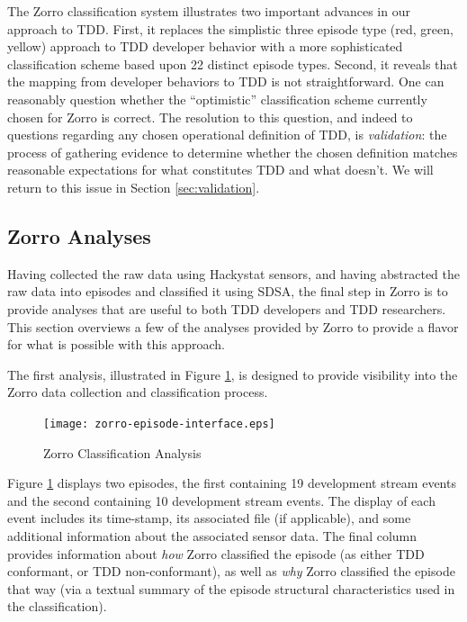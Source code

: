 \documentclass[smallextended]{svjour3}     %
\begin{document}
The Zorro classification system illustrates two important advances in our
approach to TDD.  First, it replaces the simplistic three episode type
(red, green, yellow) approach to TDD developer behavior with a more
sophisticated classification scheme based upon 22 distinct episode
types. Second, it reveals that the mapping from developer behaviors to TDD
is not straightforward. One can reasonably question whether the
``optimistic'' classification scheme currently chosen for Zorro is correct.
The resolution to this question, and indeed to questions regarding any
chosen operational definition of TDD, is {\em validation}: the process of
gathering evidence to determine whether the chosen definition matches
reasonable expectations for what constitutes TDD and what doesn't. We will
return to this issue in Section \ref{sec:validation}.


\subsection{Zorro Analyses}

Having collected the raw data using Hackystat sensors, and having
abstracted the raw data into episodes and classified it using SDSA, the
final step in Zorro is to provide analyses that are useful to both TDD
developers and TDD researchers.  This section overviews a few of the
analyses provided by Zorro to provide a flavor for what is possible with
this approach.

The first analysis, illustrated in Figure \ref{fig:Analysis-Table}, is
designed to provide visibility into the Zorro data collection and
classification process.

\begin{figure}[th]
  \center
  \texttt{[image: zorro-episode-interface.eps]}
  \caption{Zorro Classification Analysis}
  \label{fig:Analysis-Table}
\end{figure} 

Figure \ref{fig:Analysis-Table} displays two episodes, the first containing
19 development stream events and the second containing 10 development
stream events.  The display of each event includes its time-stamp, its
associated file (if applicable), and some additional information about the
associated sensor data.  The final column provides information about {\em
how} Zorro classified the episode (as either TDD conformant, or TDD
non-conformant), as well as {\em why} Zorro classified the episode that way
(via a textual summary of the episode structural characteristics used in
the classification).  
\end{document}
